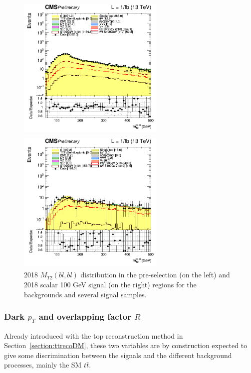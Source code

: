 \documentclass[a4paper, 10pt, openright]{report}
\begin{document}
\begin{figure}[htbp]
\centering
\begin{minipage}[b]{.48\textwidth}
\includegraphics[width=7cm, height=7cm]{figs/log_cratio_topCR_ll_2j_signal1_mt2bl.png}
\end{minipage}\hfill
\begin{minipage}[b]{.48\textwidth}
\includegraphics[width=7cm, height=7cm]{figs/log_cratio_topCR_ll_2j_signal0_mt2bl.png}
\end{minipage} \hfill
\caption{2018 $M_{T2}(bl, bl)$ distribution in the pre-selection (on the left) and 2018 scalar 100 GeV signal (on the right) regions for the backgrounds and several signal samples.}
\label{fig:SRdiscMT2bl}
\end{figure}

\subsubsection*{Dark $p_T$ and overlapping factor $R$}

Already introduced with the top reconstruction method in Section~\ref{section:ttrecoDM}, these two variables are by construction expected to give some discrimination between the signals and the different background processes, mainly the \ac{SM} $t \bar t$. 
\end{document}
